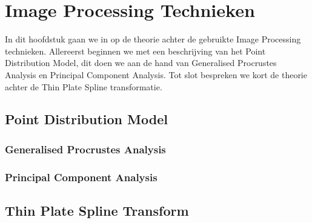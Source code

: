 \section{Image Processing Technieken}
\label{Image Processing Technieken}
In dit hoofdstuk gaan we in op de theorie achter de gebruikte Image Processing technieken. Allereerst beginnen we met een beschrijving van het Point Distribution Model, dit doen we aan de hand van Generalised Procrustes Analysis en Principal Component Analysis. Tot slot bespreken we kort de theorie achter de Thin Plate Spline transformatie. 


\subsection{Point Distribution Model}

\subsubsection{Generalised Procrustes Analysis}

\subsubsection{Principal Component Analysis}

\subsection{Thin Plate Spline Transform}
